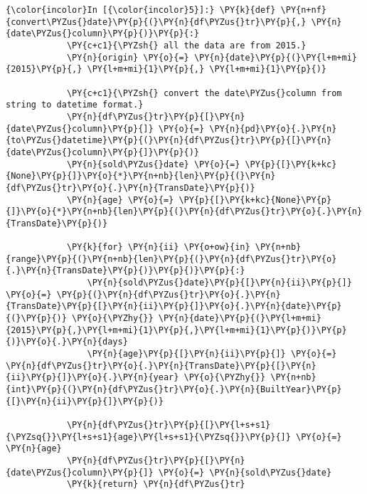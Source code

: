     \begin{Verbatim}[commandchars=\\\{\}]
{\color{incolor}In [{\color{incolor}5}]:} \PY{k}{def} \PY{n+nf}{convert\PYZus{}date}\PY{p}{(}\PY{n}{df\PYZus{}tr}\PY{p}{,} \PY{n}{date\PYZus{}column}\PY{p}{)}\PY{p}{:}
            \PY{c+c1}{\PYZsh{} all the data are from 2015.}
            \PY{n}{origin} \PY{o}{=} \PY{n}{date}\PY{p}{(}\PY{l+m+mi}{2015}\PY{p}{,} \PY{l+m+mi}{1}\PY{p}{,} \PY{l+m+mi}{1}\PY{p}{)}
            
            \PY{c+c1}{\PYZsh{} convert the date\PYZus{}column from string to datetime format.}
            \PY{n}{df\PYZus{}tr}\PY{p}{[}\PY{n}{date\PYZus{}column}\PY{p}{]} \PY{o}{=} \PY{n}{pd}\PY{o}{.}\PY{n}{to\PYZus{}datetime}\PY{p}{(}\PY{n}{df\PYZus{}tr}\PY{p}{[}\PY{n}{date\PYZus{}column}\PY{p}{]}\PY{p}{)}
            \PY{n}{sold\PYZus{}date} \PY{o}{=} \PY{p}{[}\PY{k+kc}{None}\PY{p}{]}\PY{o}{*}\PY{n+nb}{len}\PY{p}{(}\PY{n}{df\PYZus{}tr}\PY{o}{.}\PY{n}{TransDate}\PY{p}{)}
            \PY{n}{age} \PY{o}{=} \PY{p}{[}\PY{k+kc}{None}\PY{p}{]}\PY{o}{*}\PY{n+nb}{len}\PY{p}{(}\PY{n}{df\PYZus{}tr}\PY{o}{.}\PY{n}{TransDate}\PY{p}{)}
            
            \PY{k}{for} \PY{n}{ii} \PY{o+ow}{in} \PY{n+nb}{range}\PY{p}{(}\PY{n+nb}{len}\PY{p}{(}\PY{n}{df\PYZus{}tr}\PY{o}{.}\PY{n}{TransDate}\PY{p}{)}\PY{p}{)}\PY{p}{:}
                \PY{n}{sold\PYZus{}date}\PY{p}{[}\PY{n}{ii}\PY{p}{]} \PY{o}{=} \PY{p}{(}\PY{n}{df\PYZus{}tr}\PY{o}{.}\PY{n}{TransDate}\PY{p}{[}\PY{n}{ii}\PY{p}{]}\PY{o}{.}\PY{n}{date}\PY{p}{(}\PY{p}{)} \PY{o}{\PYZhy{}} \PY{n}{date}\PY{p}{(}\PY{l+m+mi}{2015}\PY{p}{,}\PY{l+m+mi}{1}\PY{p}{,}\PY{l+m+mi}{1}\PY{p}{)}\PY{p}{)}\PY{o}{.}\PY{n}{days}
                \PY{n}{age}\PY{p}{[}\PY{n}{ii}\PY{p}{]} \PY{o}{=} \PY{n}{df\PYZus{}tr}\PY{o}{.}\PY{n}{TransDate}\PY{p}{[}\PY{n}{ii}\PY{p}{]}\PY{o}{.}\PY{n}{year} \PY{o}{\PYZhy{}} \PY{n+nb}{int}\PY{p}{(}\PY{n}{df\PYZus{}tr}\PY{o}{.}\PY{n}{BuiltYear}\PY{p}{[}\PY{n}{ii}\PY{p}{]}\PY{p}{)}
            
            \PY{n}{df\PYZus{}tr}\PY{p}{[}\PY{l+s+s1}{\PYZsq{}}\PY{l+s+s1}{age}\PY{l+s+s1}{\PYZsq{}}\PY{p}{]} \PY{o}{=} \PY{n}{age}
            \PY{n}{df\PYZus{}tr}\PY{p}{[}\PY{n}{date\PYZus{}column}\PY{p}{]} \PY{o}{=} \PY{n}{sold\PYZus{}date}
            \PY{k}{return} \PY{n}{df\PYZus{}tr}
\end{Verbatim}


